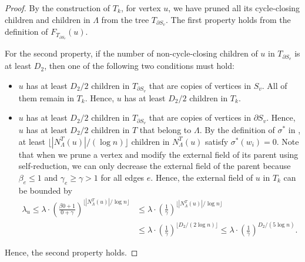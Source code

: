 \documentclass[11pt]{amsart}
\newcommand{\tp}[1]{{\left( #1 \right)}}
\newcommand{\nbd}[2]{N_{#1}^{#2}}
\theoremstyle{definition}
\theoremstyle{remark}
\begin{document}
\begin{proof}
By the construction of $T_k$, for vertex $u$, we have pruned all its cycle-closing children and children in $\Lambda$ from the tree $T_{\partial S_v}$. The first property holds from the definition of $F_{T_{\partial S_v}}(u)$.

For the second property, if the number of non-cycle-closing children of $u$ in $T_{\partial S_v}$ is at least $D_2$, then one of the following two conditions must hold:
\begin{itemize}
    \item $u$ has at least $D_2/2$ children in $T_{\partial S_v}$ that are copies of vertices in $S_v$. All of them remain in $T_k$. Hence, $u$ has at least $D_2/2$ children in $T_k$.
    \item $u$ has at least $D_2/2$ children in $T_{\partial S_v}$ that are copies of vertices in $\partial S_v$. Hence, $u$ has at least $D_2/2$ children in $T$ that belong to $\Lambda$. By the definition of $\sigma^*$ in , at least $\lfloor |N^T_\Lambda(u)|/(\log n)  \rfloor$ children in $\nbd{\Lambda}{T}(u)$ satisfy $\sigma^*(w_i) = 0$. Note that when we prune a vertex and modify the external field of its parent using self-reduction, we can only decrease the external field of the parent because $\beta_e \leq 1$ and $\gamma_e \geq \gamma > 1$ for all edges $e$. Hence, the external field of $u$ in $T_k$ can be bounded by
    \begin{align*}
    \lambda_u \leq \lambda \cdot \tp{\frac{\beta 0 + 1}{0 + \gamma}}^{\lfloor |N^T_\Lambda(u)|/\log n \rfloor} &\leq \lambda \cdot \tp{\frac{1}{\gamma}}^{\lfloor |N^T_\Lambda(u)|/ \log n \rfloor}\\
     &\leq \lambda \cdot \tp{\frac{1}{\gamma}}^{\lfloor D_2/(2 \log n) \rfloor} \leq \lambda \cdot \tp{\frac{1}{\gamma}}^{D_2/(5 \log n)}.
    \end{align*}
\end{itemize}
Hence, the second property holds.
\end{proof}
\end{document}
